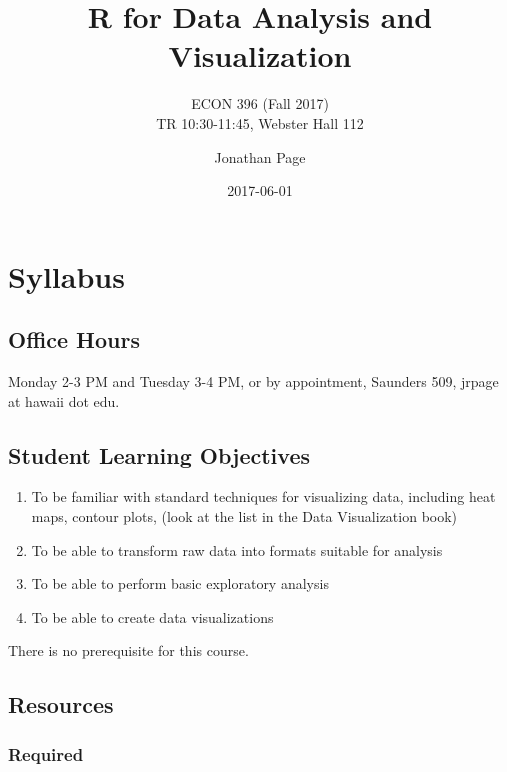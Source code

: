 \documentclass[]{book}
\title{R for Data Analysis and Visualization}
\subtitle{ECON 396 (Fall 2017)\\
TR 10:30-11:45, Webster Hall 112}
\author{Jonathan Page}
\date{2017-06-01}
\providecommand{\tightlist}{%
  \setlength{\itemsep}{0pt}\setlength{\parskip}{0pt}}
\begin{document}
\maketitle

{
\setcounter{tocdepth}{1}
\tableofcontents
}
\chapter*{Syllabus}\label{syllabus}

\section*{Office Hours}\label{office-hours}

Monday 2-3 PM and Tuesday 3-4 PM, or by appointment, Saunders 509,
jrpage at hawaii dot edu.

\section*{Student Learning
Objectives}\label{student-learning-objectives}

\begin{enumerate}
\def\labelenumi{\arabic{enumi}.}
\tightlist
\item
  To be familiar with standard techniques for visualizing data,
  including heat maps, contour plots, (look at the list in the Data
  Visualization book)
\item
  To be able to transform raw data into formats suitable for analysis
\item
  To be able to perform basic exploratory analysis
\item
  To be able to create data visualizations
\end{enumerate}

There is no prerequisite for this course.

\section*{Resources}\label{resources}

\subsection*{Required}\label{required}
\end{document}
